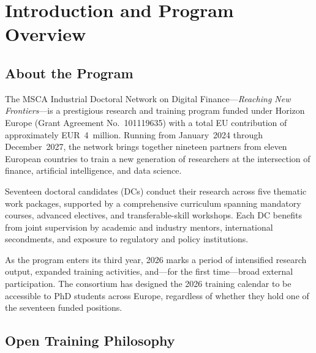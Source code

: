 \chapter{Introduction and Program Overview}
\label{ch:introduction}

\section{About the Program}
\label{sec:about}

The MSCA Industrial Doctoral Network on Digital Finance---\emph{Reaching New
Frontiers}---is a prestigious research and training program funded under
Horizon Europe (Grant Agreement No.~101119635) with a total EU contribution of
approximately EUR~4~million.  Running from January~2024 through December~2027, the network
brings together nineteen partners from eleven European countries to train a
new generation of researchers at the intersection of finance, artificial
intelligence, and data science.

Seventeen doctoral candidates (DCs) conduct their research across five thematic
work packages, supported by a comprehensive curriculum spanning mandatory
courses, advanced electives, and transferable-skill workshops.  Each DC benefits from joint supervision by academic and industry
mentors, international secondments, and exposure to regulatory and policy
institutions.

As the program enters its third year, 2026 marks a period of intensified
research output, expanded training activities, and---for the first time---broad
external participation.  The consortium has designed the 2026 training calendar
to be accessible to PhD students across Europe, regardless of whether they hold
one of the seventeen funded positions.

\vspace{8pt}
\begin{center}
  \hfill
  \hfill
  \hfill
\end{center}
\vspace{8pt}


\section{Open Training Philosophy}
\label{sec:open-training}

